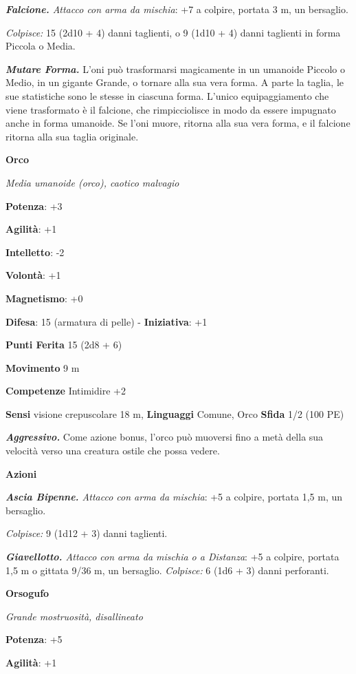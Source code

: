 \begin{multicols}{2}
\emph{\textbf{Falcione.} Attacco con arma da mischia}: +7 a colpire,
portata 3 m, un bersaglio.

\emph{Colpisce:} 15 (2d10 + 4) danni taglienti, o 9 (1d10 + 4) danni
taglienti in forma Piccola o Media.

\emph{\textbf{Mutare Forma.}} L'oni può trasformarsi magicamente in un
umanoide Piccolo o Medio, in un gigante Grande, o tornare alla sua vera
forma. A parte la taglia, le sue statistiche sono le stesse in ciascuna
forma. L'unico equipaggiamento che viene trasformato è il falcione, che
rimpicciolisce in modo da essere impugnato anche in forma umanoide. Se
l'oni muore, ritorna alla sua vera forma, e il falcione ritorna alla sua
taglia originale.

\textbf{Orco}

\emph{Media umanoide (orco), caotico malvagio}

\textbf{Potenza}: +3

\textbf{Agilità}: +1

\textbf{Intelletto}: -2

\textbf{Volontà}: +1

\textbf{Magnetismo}: +0

\textbf{Difesa}: 15 (armatura di pelle) - \textbf{Iniziativa}: +1

\textbf{Punti Ferita} 15 (2d8 + 6)

\textbf{Movimento} 9 m

\textbf{Competenze} Intimidire +2

\textbf{Sensi} visione crepuscolare 18 m, 
\textbf{Linguaggi} Comune, Orco \textbf{Sfida} 1/2 (100 PE)

\emph{\textbf{Aggressivo.}} Come azione bonus, l'orco può muoversi fino
a metà della sua velocità verso una creatura ostile che possa vedere.

\textbf{Azioni}

\emph{\textbf{Ascia Bipenne.} Attacco con arma da mischia}: +5 a
colpire, portata 1,5 m, un bersaglio.

\emph{Colpisce:} 9 (1d12 + 3) danni taglienti.

\emph{\textbf{Giavellotto.} Attacco con arma da mischia o a Distanza}:
+5 a colpire, portata 1,5 m o gittata 9/36 m, un bersaglio.
\emph{Colpisce:} 6 (1d6 + 3) danni perforanti.

\textbf{Orsogufo}

\emph{Grande mostruosità, disallineato}

\textbf{Potenza}: +5

\textbf{Agilità}: +1


\end{multicols}
